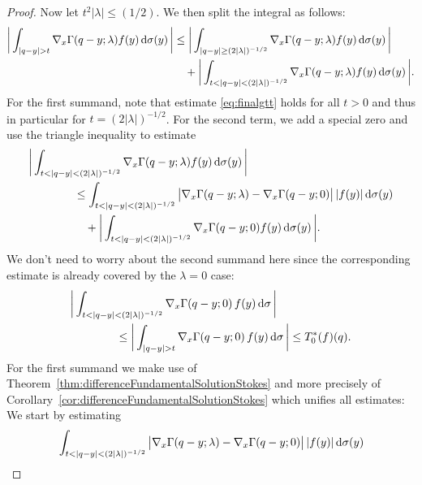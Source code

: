 \begin{proof}
  \newpage
  Now let $t^2 |\lambda| \leq ({1}/{2})$.
  We then split the integral as follows:
  \begin{align*}
    \bigg| \int_{|q - y| > t} \nabla_x \Gamma(q - y; \lambda) f(y) \, {\operatorname{d}\!{\sigma}}(y) \, \bigg| 
     &\leq \bigg| \int_{|q -y | \geq (2|\lambda|)^{-1/2}} \nabla_x\Gamma(q - y; \lambda)f(y) \, {\operatorname{d}\!{\sigma}}(y)\, \bigg| \\
     &\quad + \bigg| \int_{t < |q - y| < (2|\lambda|)^{-1/2}} \nabla_x\Gamma(q - y; \lambda)f(y) \, {\operatorname{d}\!{\sigma}}(y)\, \bigg|.
  \end{align*}
  For the first summand, note that estimate \eqref{eq:finalgtt} holds for all $t > 0$ and thus in particular for  $t = (2|\lambda|)^{-1/2}$.
  For the second term, we add a special zero and use the triangle inequality to estimate
  \begin{align*}
    &\bigg| \int_{t < |q - y| < (2|\lambda|)^{-1/2}} \nabla_x\Gamma(q - y; \lambda)f(y) \, {\operatorname{d}\!{\sigma}}(y) \,\bigg| \\
     &\qquad\qquad\leq \int_{t < |q - y| < (2|\lambda|)^{-1/2}} \big|\nabla_x\Gamma(q - y; \lambda) - \nabla_x\Gamma(q - y; 0) \big| \, |f(y)| \, {\operatorname{d}\!{\sigma}}(y) \\
     &\qquad\qquad\quad + \bigg| \int_{t < |q - y| < (2|\lambda|)^{-1/2}} \nabla_x\Gamma(q - y; 0) f(y)  \, {\operatorname{d}\!{\sigma}}(y)\, \bigg|.
  \end{align*}
  We don't need to worry about the second summand here since the corresponding estimate is already covered by the $\lambda = 0$ case:
  \begin{align}
    \label{eq:lambda0case}
    \begin{alignedat}{1}
     &\bigg| \int_{t < |q - y| < (2|\lambda|)^{-1/2}} \nabla_x\Gamma(q - y; 0) \, f(y)  \, {\operatorname{d}\!{\sigma}}\, \bigg| \\
      &\qquad\qquad \leq \bigg| \int_{|q - y| > t} \nabla_x\Gamma(q - y; 0) \, f(y)  \, {\operatorname{d}\!{\sigma}} \,\bigg| 
     \leq T_0^*(f)(q).
    \end{alignedat}
   \end{align}
   For the first summand we make use of Theorem~\ref{thm:differenceFundamentalSolutionStokes} and more precisely of Corollary~\ref{cor:differenceFundamentalSolutionStokes} which unifies all estimates: We start by estimating
   \begin{align}
     \label{eq:estDiff}
     \begin{alignedat}{1}
       &\int_{t < |q - y| < (2|\lambda|)^{-1/2}} \big|\nabla_x\Gamma(q - y; \lambda) - \nabla_x\Gamma(q - y; 0) \big| \, |f(y)| \d\sigma(y) \\

\end{alignedat}
\end{align}
\end{proof}
